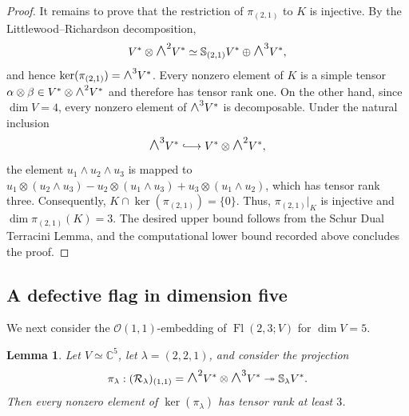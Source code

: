 \documentclass[a4paper,reqno]{amsart}
\theoremstyle{plainnopunct}
\newtheorem{lemma}[lemma]{Lemma}
\theoremstyle{definitionnopunct}
\newcommand{\superwedge}{\mathlarger{\mathlarger{\wedge}}}
\newcommand{\C}{\mathbb{C}}
\renewcommand{\S}{\mathbb{S}}
\newcommand{\cO}{\mathcal{O}}
\newcommand{\cR}{\mathcal{R}}
\DeclareMathOperator{\Fl}{Fl}
\begin{document}
\begin{proof}
It remains to prove that the restriction of
$\pi_{(2,1)}$
to $K$ is injective. By the Littlewood--Richardson decomposition,
\[
V^*\otimes\superwedge^2V^*
\simeq
\S_{(2,1)}V^*
\oplus
\superwedge^3V^*,
\]
and hence $\ker(\pi_{(2,1)})
=
\superwedge^3V^*$. Every nonzero element of $K$ is a simple tensor
$\alpha\otimes\beta
\in
V^*\otimes\superwedge^2V^*$
and therefore has tensor rank one. On the other hand, since
$\dim V=4$, every nonzero element of $\superwedge^3V^*$ is
decomposable. Under the natural inclusion
\[
\superwedge^3V^*
\lhook\joinrel\longrightarrow
V^*\otimes\superwedge^2V^*,
\]
the element $u_1\wedge u_2\wedge u_3$
is mapped to
$u_1\otimes(u_2\wedge u_3)
-
u_2\otimes(u_1\wedge u_3)
+
u_3\otimes(u_1\wedge u_2)$,
which has tensor rank three. Consequently,
$K\cap\ker(\pi_{(2,1)})
=
\{0\}$.
Thus, $\pi_{(2,1)}|_K$ is injective and $\dim\pi_{(2,1)}(K)=3$.
The desired upper bound follows from the Schur Dual Terracini Lemma, and the
computational lower bound recorded above concludes the proof.
\end{proof}

\subsection{A defective flag in dimension five}

We next consider the $\cO(1,1)$-embedding of
$\Fl(2,3;V)$ for $\dim V=5$.


\begin{lemma}\label{lem: tensorrank 221}
Let $V\simeq\C^5$, let $\lambda=(2,2,1)$, and consider the projection
\[
\pi_\lambda:(\cR_\lambda)_{(1,1)}=\superwedge^2V^*\otimes\superwedge^3V^*\twoheadrightarrow\S_\lambda V^*.
\]
Then every nonzero element of $\ker(\pi_\lambda)$ has tensor rank at least $3$.
\end{lemma}
\end{document}
